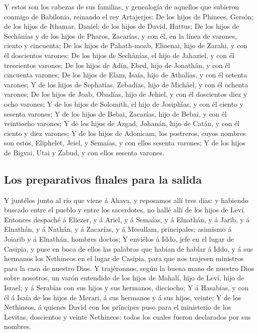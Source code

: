  Y estos son los cabezas de sus familias, y genealogía de
aquellos que subieron conmigo de Babilonia, reinando el rey Artajerjes:
 De los hijos de Phinees, Gersón; de los hijos de Ithamar,
Daniel; de los hijos de David, Hattus;  De los hijos de
Sechânías y de los hijos de Pharos, Zacarías, y con él, en la línea de
varones, ciento y cincuenta;  De los hijos de Pahath-moab,
Elioenai, hijo de Zarahi, y con él doscientos varones;  De
los hijos de Sechânías, el hijo de Jahaziel, y con él trescientos
varones;  De los hijos de Adín, Ebed, hijo de Jonathán, y
con él cincuenta varones;  De los hijos de Elam, Isaía,
hijo de Athalías, y con él setenta varones;  Y de los
hijos de Sephatías, Zebadías, hijo de Michâel, y con él ochenta varones;
 De los hijos de Joab, Obadías, hijo de Jehiel, y con él
doscientos diez y ocho varones;  Y de los hijos de
Solomith, el hijo de Josiphías, y con él ciento y sesenta varones;
 Y de los hijos de Bebai, Zacarías, hijo de Bebai, y con
él veintiocho varones;  Y de los hijos de Azgad, Johanán,
hijo de Catán, y con él ciento y diez varones;  Y de los
hijos de Adonicam, los postreros, cuyos nombres son estos, Eliphelet,
Jeiel, y Semaías, y con ellos sesenta varones;  Y de los
hijos de Bigvai, Utai y Zabud, y con ellos sesenta varones.

\hypertarget{los-preparativos-finales-para-la-salida}{%
\subsection{Los preparativos finales para la
salida}\label{los-preparativos-finales-para-la-salida}}

 Y juntélos junto al río que viene á Ahava, y reposamos
allí tres días: y habiendo buscado entre el pueblo y entre los
sacerdotes, no hallé allí de los hijos de Leví.  Entonces
despaché á Eliezer, y á Ariel, y á Semaías, y á Elnathán, y á Jarib, y á
Elnathán, y á Nathán, y á Zacarías, y á Mesullam, principales; asimismo
á Joiarib y á Elnathán, hombres doctos;  Y enviélos á
Iddo, jefe en el lugar de Casipia, y puse en boca de ellos las palabras
que habían de hablar á Iddo, y á sus hermanos los Nethineos en el lugar
de Casipia, para que nos trajesen ministros para la casa de nuestro
Dios.  Y trajéronnos, según la buena mano de nuestro Dios
sobre nosotros, un varón entendido de los hijos de Mahalí, hijo de Leví,
hijo de Israel; y á Serabías con sus hijos y sus hermanos, dieciocho;
 Y á Hasabías, y con él á Isaía de los hijos de Merari, á
sus hermanos y á sus hijos, veinte;  Y de los Nethineos,
á quienes David con los príncipes puso para el ministerio de los
Levitas, doscientos y veinte Nethineos: todos los cuales fueron
declarados por sus nombres.

